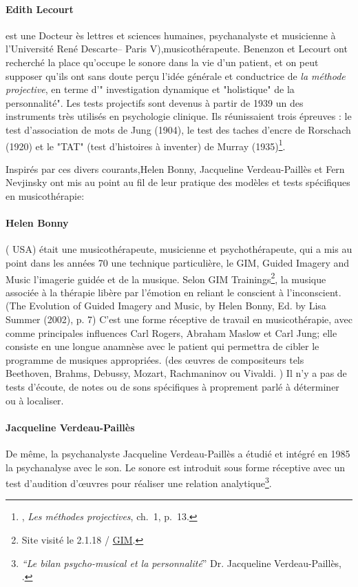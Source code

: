         \paragraph*{Edith Lecourt} est une Docteur ès lettres et sciences humaines, psychanalyste et musicienne à l'Université René Descarte-- Paris V),musicothérapeute.
        Benenzon et Lecourt ont  recherché la place qu'occupe le sonore dans la vie d'un patient, et on peut supposer qu'ils ont sans doute perçu l'idée générale et conductrice de \textsl{la méthode projective}, en terme 
	d'" investigation dynamique et "holistique" de la
        personnalité". Les tests projectifs sont devenus à partir
        de 1939 un des instruments très utilisés en psychologie
        clinique. Ils réunissaient trois épreuves : le test
        d'association de mots de Jung (1904), le test des taches
        d'encre de Rorschach (1920) et le "TAT" (test d'histoires à
        inventer) de Murray (1935)\footnote{\cite{chabert.anzieu:methodes}, \emph{Les méthodes projectives}, ch.~1, p.~13.}.
		

	
Inspirés par ces divers courants,Helen Bonny, Jacqueline Verdeau-Paillès et Fern Nevjinsky ont  mis au point au fil de leur pratique des modèles et tests spécifiques en musicothérapie:


\paragraph{Helen Bonny } ( USA) était une musicothérapeute,
musicienne et psychothérapeute, qui a mis au point dans les années 70
une technique particulière, le GIM, \og Guided Imagery and Music\fg
l'imagerie guidée et de la musique. Selon GIM
Trainings\footnote{Site visité le 2.1.18 / \href{\#gimsite}{GIM}.}, la
musique associée à la thérapie libère par l'émotion en reliant le
conscient à l'inconscient.(The Evolution of Guided Imagery and Music, by Helen Bonny, Ed. by Lisa Summer (2002), p. 7)
 C'est une forme réceptive de travail
en musicothérapie, avec comme principales influences Carl Rogers, Abraham Maslow et Carl Jung; elle  consiste en une longue anamnèse avec le
patient qui permettra de cibler le programme de musiques appropriées. 
(des \oe uvres de compositeurs tels Beethoven, Brahms, Debussy,
Mozart, Rachmaninov ou Vivaldi. )
Il n'y a  pas de
tests d'écoute, de notes ou de sons spécifiques à proprement parlé à déterminer ou à localiser.

\paragraph{Jacqueline Verdeau-Paillès} De même, la psychanalyste Jacqueline Verdeau-Paillès a étudié et
intégré en 1985 la psychanalyse avec le son.  Le sonore est  introduit
sous forme réceptive avec un test d'audition d'\oe uvres pour réaliser
une relation analytique\footnote{\emph{``Le bilan psycho-musical et la
    personnalité}'' Dr. Jacqueline Verdeau-Paillès,
  \cite{verdeau-pailles}.}.

